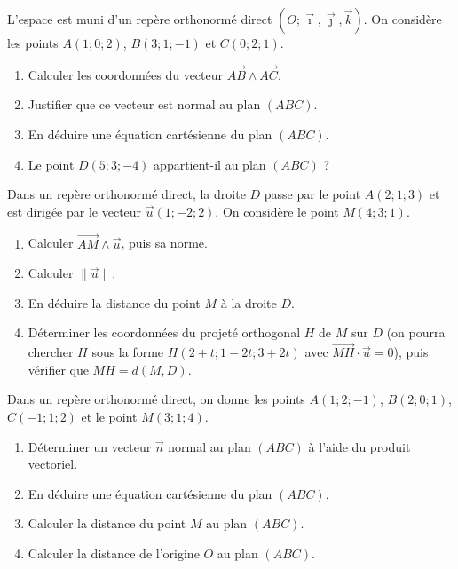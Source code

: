 \documentclass[11pt]{article}
\newcounter{popsec}
\newcounter{popsub}
\newcommand{\courssub}[1]{%
  \stepcounter{popsub}%
  \par\vspace{9pt}\noindent{\popxbold\fontsize{11.5}{13}\selectfont\color{popink}{\color{poporange}\thepopsec.\thepopsub}\hspace{6pt}#1}\par\nopagebreak\vspace{4pt}
}
\begin{document}
\courssub{Je m'entraîne}

\begin{exercice}
L'espace est muni d'un repère orthonormé direct $(O ; \vec{\imath}, \vec{\jmath}, \vec{k})$. On considère les points $A(1 ; 0 ; 2)$, $B(3 ; 1 ; -1)$ et $C(0 ; 2 ; 1)$.
\begin{enumerate}
\item Calculer les coordonnées du vecteur $\overrightarrow{AB} \wedge \overrightarrow{AC}$.
\item Justifier que ce vecteur est normal au plan $(ABC)$.
\item En déduire une équation cartésienne du plan $(ABC)$.
\item Le point $D(5 ; 3 ; -4)$ appartient-il au plan $(ABC)$ ?
\end{enumerate}
\end{exercice}

\begin{exercice}
Dans un repère orthonormé direct, la droite $D$ passe par le point $A(2 ; 1 ; 3)$ et est dirigée par le vecteur $\vec{u}(1 ; -2 ; 2)$. On considère le point $M(4 ; 3 ; 1)$.
\begin{enumerate}
\item Calculer $\overrightarrow{AM} \wedge \vec{u}$, puis sa norme.
\item Calculer $\|\vec{u}\|$.
\item En déduire la distance du point $M$ à la droite $D$.
\item Déterminer les coordonnées du projeté orthogonal $H$ de $M$ sur $D$ (on pourra chercher $H$ sous la forme $H(2 + t ; 1 - 2t ; 3 + 2t)$ avec $\overrightarrow{MH} \cdot \vec{u} = 0$), puis vérifier que $MH = d(M, D)$.
\end{enumerate}
\end{exercice}

\begin{exercice}
Dans un repère orthonormé direct, on donne les points $A(1 ; 2 ; -1)$, $B(2 ; 0 ; 1)$, $C(-1 ; 1 ; 2)$ et le point $M(3 ; 1 ; 4)$.
\begin{enumerate}
\item Déterminer un vecteur $\vec{n}$ normal au plan $(ABC)$ à l'aide du produit vectoriel.
\item En déduire une équation cartésienne du plan $(ABC)$.
\item Calculer la distance du point $M$ au plan $(ABC)$.
\item Calculer la distance de l'origine $O$ au plan $(ABC)$.
\end{enumerate}
\end{exercice}
\end{document}
